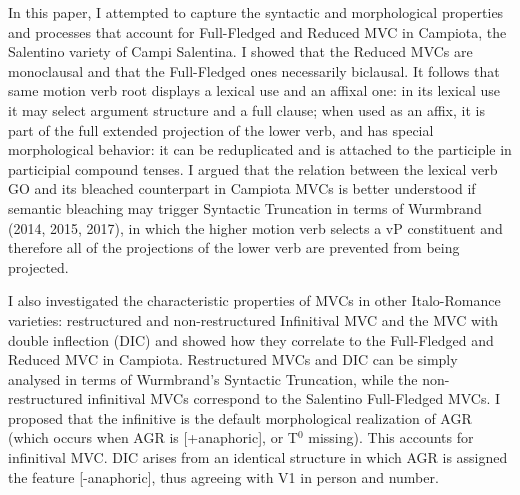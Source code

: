 \documentclass[output=paper,colorlinks,citecolor=brown,
]{langscibook}
\begin{document}
In this paper, I attempted to capture the syntactic and morphological properties and processes that account for Full-Fledged and Reduced MVC in Campiota, the Salentino variety of Campi Salentina. I showed that the Reduced MVCs are monoclausal and that the Full-Fledged ones necessarily biclausal. It follows that same motion verb root displays a lexical use and an affixal one:  in its lexical use it may select argument structure and a full clause; when used as an affix, it is part of the full extended projection of the lower verb, and has special morphological behavior: it can be reduplicated and is attached to the participle in participial compound tenses. I argued that the relation between the lexical verb GO and its bleached counterpart in Campiota MVCs is better understood if semantic bleaching may trigger Syntactic Truncation  in terms of Wurmbrand (2014, 2015, 2017), in which the higher motion verb selects a vP constituent and therefore all of the projections of the lower verb are prevented from being projected. 
 
I also investigated the characteristic properties of MVCs in other Italo-Romance varieties: restructured and non-restructured Infinitival MVC and the MVC with double inflection (DIC) and showed how they correlate to the Full-Fledged and Reduced MVC in Campiota.  Restructured MVCs and DIC can be simply analysed in terms of Wurmbrand's Syntactic Truncation, while the non-restructured infinitival MVCs correspond to the Salentino Full-Fledged MVCs.  I proposed that the infinitive is the default morphological realization of AGR (which occurs when AGR is [+anaphoric], or T$^0$ missing).  This accounts for infinitival MVC.  DIC arises from an identical structure in which AGR is assigned the feature [-anaphoric], thus agreeing with V1 in person and number. 

\end{document}
